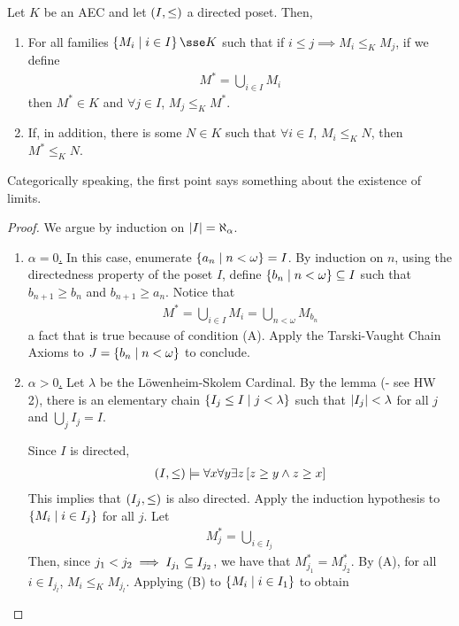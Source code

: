 \begin{boxtheorem}
    Let $K$ be an AEC and let $\left( I, \leq \right)$ a directed poset. Then,
    \begin{enumerate}[label = (\Alph*)]
        \item For all families $\setst{M_i}{i \in I} \sse K$ such that if $i \leq j \implies M_i \leq_K M_j$, if we define
        \begin{align*}
            M^* = \bigcup_{i \in I} M_i
        \end{align*}
        then $M^* \in K$ and $\forall j \in I$, $M_j \leq_K M^*$.

        \item If, in addition, there is some $N \in K$ such that $\forall i \in I$, $M_i \leq_K N$, then $M^* \leq_K N$.
    \end{enumerate}
    Categorically speaking, the first point says something about the existence of limits.
\end{boxtheorem}
\begin{proof}
    We argue by induction on $\left\lvert I \right\rvert = \aleph_{\alpha}$.

    \begin{enumerate}
        \item \underline{$\alpha = 0$.} In this case, enumerate $\left\{ a_n \; \middle\vert \; n < \omega \right\} = I$. By induction on $n$, using the directedness property of the poset $I$, define $\left\{ b_n \; \middle\vert \; n < \omega \right\} \subseteq I$ such that $b_{n+1} \geq b_n$ and $b_{n+1} \geq a_n$. Notice that
        \begin{align*}
            M^* = \bigcup_{i \in I} M_i = \bigcup_{n < \omega} M_{b_n}
        \end{align*}
        a fact that is true because of condition (A). Apply the Tarski-Vaught Chain Axioms to $J = \left\{ b_n \; \middle\vert \; n < \omega \right\}$ to conclude. %

        \item \underline{$\alpha > 0$.} Let $\lambda$ be the Löwenheim-Skolem Cardinal. By the lemma (\sorry - see HW 2), there is an elementary chain $\left\{ I_j \leq I \; \middle\vert \; j < \lambda \right\}$ such that $\left\lvert I_j \right\rvert < \lambda$ for all $j$ and $\bigcup_{j} I_j = I$.
        
        Since $I$ is directed,
        \begin{align*}
            \left( I, \leq \right) \models \forall x \forall y \exists z \left[ z \geq y \land z \geq x \right]
        \end{align*}
        This implies that $\left( I_j, \leq \right)$ is also directed. Apply the induction hypothesis to $\left\{ M_i \; \middle\vert \; i \in I_j \right\}$ for all $j$. Let
        \begin{align*}
            M_j^* = \bigcup_{i \in I_j}
        \end{align*}
        Then, since $j_1 < j_2 \implies I_{j_1} \subseteq I_{j_2}$, we have that $M_{j_1}^* = M_{j_2}^*$. By (A), for all $i \in I_{j_l}$, $M_i \leq_K M_{j_l}$. Applying (B) to $\left\{ M_i \; \middle\vert \; i \in I_1 \right\}$ to obtain \sorry
    \end{enumerate}
\end{proof}